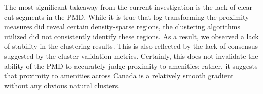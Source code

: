 \documentclass[11pt, a4paper]{article}
\begin{document}
\par
\hspace{1pc} The most significant takeaway from the current investigation is the lack of clear-cut segments in the PMD. While it is true that log-transforming the proximity measures did reveal certain density-sparse regions, the clustering algorithms utilized did not consistently identify these regions. As a result, we observed a lack of stability in the clustering results. This is also reflected by the lack of consensus suggested by the cluster validation metrics. Certainly, this does not invalidate the ability of the PMD to accurately judge proximity to amenities; rather, it suggests that proximity to amenities across Canada is a relatively smooth gradient without any obvious natural clusters.























\end{document}
